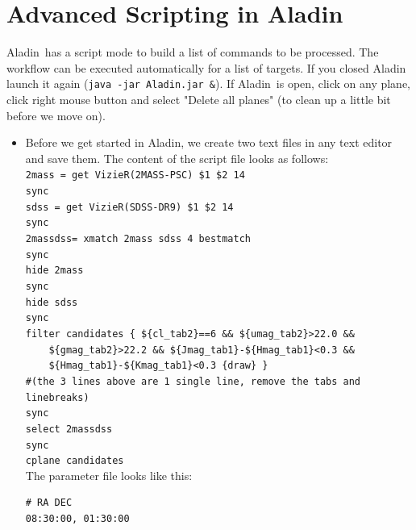 \documentclass [a4paper, 12pt]{article}
\newcommand{\aladin}{{\textsc{A}{ladin}}}
\begin{document}
\section{Advanced Scripting in \aladin}
\aladin\ has a script mode to build a list of commands to be processed. The 
workflow can be executed automatically for a list of targets. If you closed 
\aladin\, launch it again (\texttt{java -jar Aladin.jar \&}). If \aladin\ 
is open, click on any plane, click right mouse button and select "Delete all 
planes" (to clean up a little bit before we move on). 
\newpage
\begin{itemize}
    
\item Before we get started in \aladin, we create two text files in any text 
editor and save them. The content of the script file looks as follows:\\

\texttt{2mass = get VizieR(2MASS-PSC) \$1 \$2 14\textquotesingle}\\
\texttt{sync}\\
\texttt{sdss = get VizieR(SDSS-DR9) \$1 \$2 14\textquotesingle}\\
\verb|sync|\\
\verb|2massdss= xmatch 2mass sdss 4 bestmatch|\\
\verb|sync|\\
\verb|hide 2mass|\\
\verb|sync|\\
\verb|hide sdss|\\
\verb|sync|\\
\verb|filter candidates { ${cl_tab2}==6 && ${umag_tab2}>22.0 && |\\
\verb|    ${gmag_tab2}>22.2 && ${Jmag_tab1}-${Hmag_tab1}<0.3 &&|\\
\verb|    ${Hmag_tab1}-${Kmag_tab1}<0.3 {draw} }|\\
\verb|#(the 3 lines above are 1 single line, remove the tabs and linebreaks)|\\
\verb|sync|\\
\verb|select 2massdss|\\
\verb|sync|\\
\verb|cplane candidates|\\

The parameter file looks like this:
\begin{verbatim}
# RA DEC
08:30:00, 01:30:00
\end{verbatim}


\end{itemize}
\end{document}
